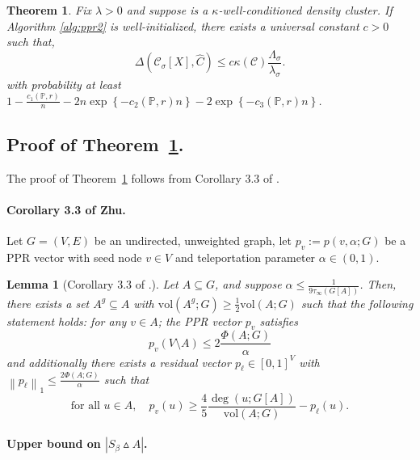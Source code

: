 \documentclass[11pt,twoside]{article}
\newtheorem{theorem}{Theorem}
\newtheorem{lemma}{Lemma}
\newcommand{\set}[1]{\left\{#1\right\}}
\newcommand{\vol}{\mathrm{vol}}
\newcommand{\abs}[1]{\left \lvert #1 \right \rvert}
\newcommand{\norm}[1]{\left\lVert#1\right\rVert}
\newcommand{\1}{\mathbf{1}}
\newcommand{\Xbf}{X}             %
\newcommand{\Pbb}{\mathbb{P}}
\newcommand{\Cbb}{\mathbb{C}}
\newcommand{\Cset}{\mathcal{C}}
\newcommand{\Csig}{\Cset_{\sigma}}
\newcommand{\Cest}{\widehat{C}}
\begin{document}
\begin{theorem}
	\label{thm:misclassification_rate}
	Fix $\lambda > 0$ and suppose \smash{$\Cset \in \Cbb_f(\lambda)$} is a
	$\kappa$-well-conditioned density cluster. If Algorithm
	\ref{alg:ppr2} is well-initialized, there exists a universal constant $c >
	0$ such that,
	\begin{equation}
	\label{eqn: misclassification_rate_ub}
	\Delta(\Csig[\Xbf], \Cest) \leq c \kappa(\Cset)
	\frac{\Lambda_{\sigma}}{\lambda_{\sigma}}. 
	\end{equation}
	with probability at least $1 - \frac{c_1(\Pbb,r)}{n} - 2n\exp\set{-c_2(\Pbb,r)n} - 2\exp\set{-c_3(\Pbb,r)n}$.
\end{theorem}

\subsection{Proof of Theorem~\ref{thm:misclassification_rate}.}
The proof of Theorem~\ref{thm:misclassification_rate} follows from Corollary 3.3 of \citet{zhu2013}.

\paragraph{Corollary 3.3 of Zhu.}
Let $G = (V,E)$ be an undirected, unweighted graph, let $p_v := p(v,\alpha;G)$ be a PPR vector with seed node $v \in V$ and teleportation parameter $\alpha \in (0,1)$. 
\begin{lemma}[Corollary 3.3 of \citet{zhu2013}.]
	\label{cor:zhu}
	Let $A \subseteq G$, and suppose $\alpha \leq \frac{1}{9\tau_{\infty}(G[A])}$. Then, there exists a set $A^g \subseteq A$ with $\vol(A^g;G) \geq \frac{1}{2}\vol(A;G)$ such that the following statement holds: for any $v \in A$; the PPR vector $p_v$ satisfies
	\begin{equation}
	\label{eqn:zhu_1}
	p_v(V \setminus A) \leq 2\frac{\Phi(A;G)}{\alpha}
	\end{equation}
	and additionally there exists a residual vector $p_{\ell} \in [0,1]^V$ with $\norm{p_{\ell}}_1 \leq \frac{2\Phi(A;G)}{\alpha}$ such that
	\begin{equation}
	\label{eqn:zhu_2}
	\textrm{for all $u \in A$}, \quad p_v(u) \geq \frac{4}{5} \frac{\deg(u;G[A])}{\vol(A;G)} - p_{\ell}(u).
	\end{equation}
\end{lemma}

\paragraph{Upper bound on $\abs{S_{\beta} \vartriangle A}$.}
\end{document}
